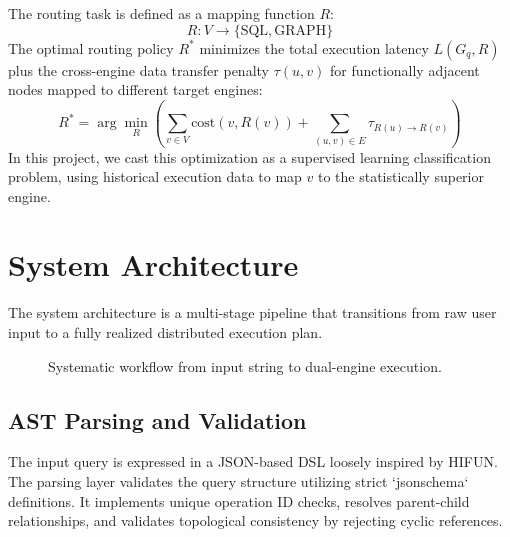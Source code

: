 \documentclass[conference]{IEEEtran}
\begin{document}
The routing task is defined as a mapping function $R$:
\begin{equation}
R: V \to \{ \text{SQL}, \text{GRAPH} \}
\end{equation}
The optimal routing policy $R^*$ minimizes the total execution latency $L(G_q, R)$ plus the cross-engine data transfer penalty $\tau(u, v)$ for functionally adjacent nodes mapped to different target engines:
\begin{equation}
R^* = \arg\min_{R} \left( \sum_{v \in V} \text{cost}(v, R(v)) + \sum_{(u, v) \in E} \tau_{R(u) \to R(v)} \right)
\end{equation}
In this project, we cast this optimization as a supervised learning classification problem, using historical execution data to map $v$ to the statistically superior engine.

\section{System Architecture}

The system architecture is a multi-stage pipeline that transitions from raw user input to a fully realized distributed execution plan.

\begin{figure}[h]
\centering
{}
\caption{Systematic workflow from input string to dual-engine execution.}
\label{fig:arch}
\end{figure}

\subsection{AST Parsing and Validation}
The input query is expressed in a JSON-based DSL loosely inspired by HIFUN. The parsing layer validates the query structure utilizing strict `jsonschema` definitions. It implements unique operation ID checks, resolves parent-child relationships, and validates topological consistency by rejecting cyclic references.
\end{document}
